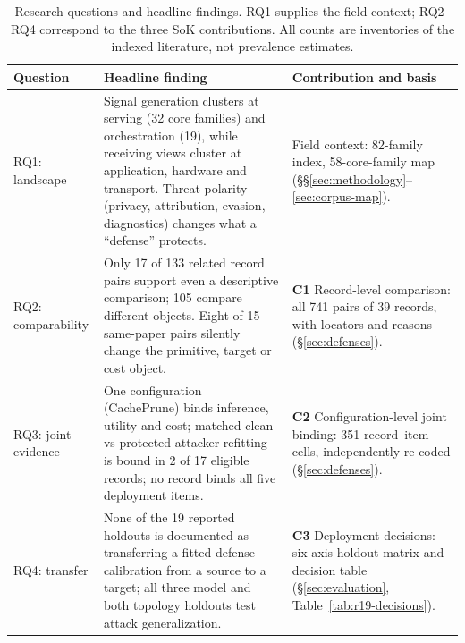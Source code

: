 \begin{table}[t]\centering\footnotesize
\caption{Research questions and headline findings. RQ1 supplies the field context; RQ2--RQ4 correspond to the three SoK contributions. All counts are inventories of the indexed literature, not prevalence estimates.}\label{tab:rq-findings}
\begin{tabularx}{\textwidth}{@{}>{\raggedright\arraybackslash}p{}Y>{\raggedright\arraybackslash}p{.27\textwidth}@{}}\toprule
Question & Headline finding & Contribution and basis\\\midrule
RQ1: landscape & Signal generation clusters at serving (32 core families) and orchestration (19), while receiving views cluster at application, hardware and transport. Threat polarity (privacy, attribution, evasion, diagnostics) changes what a ``defense'' protects. & Field context: 82-family index, 58-core-family map (\S\S\ref{sec:methodology}--\ref{sec:corpus-map}).\\
RQ2: comparability & Only 17 of 133 related record pairs support even a descriptive comparison; 105 compare different objects. Eight of 15 same-paper pairs silently change the primitive, target or cost object. & \textbf{C1} Record-level comparison: all 741 pairs of 39 records, with locators and reasons (\S\ref{sec:defenses}).\\
RQ3: joint evidence & One configuration (CachePrune) binds inference, utility and cost; matched clean-vs-protected attacker refitting is bound in 2 of 17 eligible records; no record binds all five deployment items. & \textbf{C2} Configuration-level joint binding: 351 record--item cells, independently re-coded (\S\ref{sec:defenses}).\\
RQ4: transfer & None of the 19 reported holdouts is documented as transferring a fitted defense calibration from a source to a target; all three model and both topology holdouts test attack generalization. & \textbf{C3} Deployment decisions: six-axis holdout matrix and decision table (\S\ref{sec:evaluation}, Table~\ref{tab:r19-decisions}).\\\bottomrule
\end{tabularx}\end{table}
